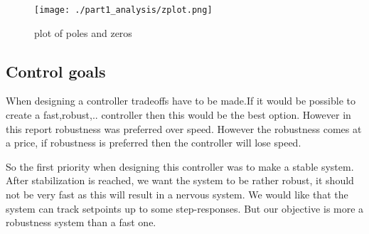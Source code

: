 \begin{figure}[H]
	\centering
	\texttt{[image: ./part1\_analysis/zplot.png]}
	\caption{plot of poles and zeros}
	\label{fig:zplot system}
\end{figure}

\subsection{Control goals}
When designing a controller tradeoffs have to be made.If it would be possible to create a fast,robust,.. controller then this would be the best option. However in this report robustness was preferred over speed. However the robustness comes at a price, if robustness is preferred then the controller will lose speed. 

So the first priority when designing this controller was to make a stable system. After stabilization is reached, we want the system to be rather robust, it should not be very fast as this will result in a nervous system. We would like that the system can track setpoints up to some step-responses. But our objective is more a robustness system than a fast one.

